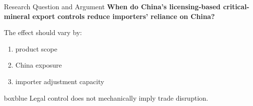\documentclass[aspectratio=169,11pt]{beamer}
\begin{document}
\begin{frame}{Research Question and Argument}
  \Large
  \textbf{When do China's licensing-based critical-mineral export controls reduce importers' reliance on China?}

  \vspace{0.55cm}
  \large
  The effect should vary by:
  \begin{enumerate}
    \item product scope
    \item China exposure
    \item importer adjustment capacity
  \end{enumerate}

  \vfill
  \begin{beamercolorbox}[sep=0.85em,wd=\textwidth]{boxblue}
    \Large Legal control does not mechanically imply trade disruption.
  \end{beamercolorbox}
\end{frame}
\end{document}
